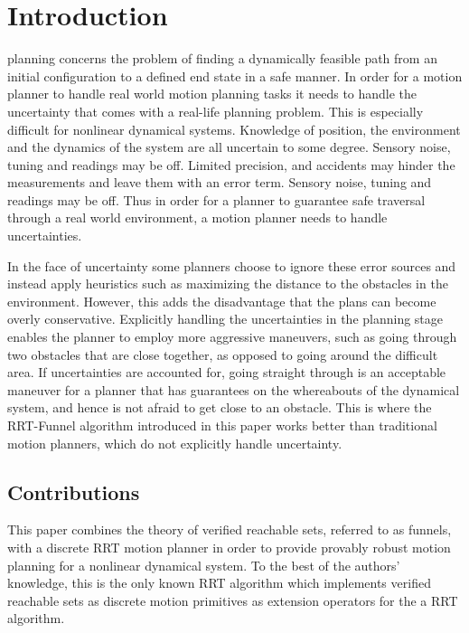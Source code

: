
\section{Introduction}
 planning concerns the problem of finding a dynamically
feasible path from an initial configuration to a defined end state in a safe
manner. In order for a motion planner to handle real world motion planning tasks
it needs to handle the uncertainty that comes with a real-life planning problem.
This is especially difficult for nonlinear dynamical systems. Knowledge of
position, the environment and the dynamics of the system are all uncertain to
some degree. Sensory noise, tuning and readings may be off. Limited precision,
and accidents may hinder the measurements and leave them with an error term.
Sensory noise, tuning and readings may be off. Thus in order for a planner to
guarantee safe traversal through a real world environment, a motion planner
needs to handle uncertainties.

In the face of uncertainty some planners choose to ignore these error sources
and instead apply heuristics such as maximizing the distance to the obstacles in
the environment. However, this adds the disadvantage that the plans can become
overly conservative. Explicitly handling the uncertainties in the planning stage
enables the planner to employ more aggressive maneuvers, such as going through
two obstacles that are close together, as opposed to going around the difficult
area. If uncertainties are accounted for, going straight through is an
acceptable maneuver for a planner that has guarantees on the whereabouts of the
dynamical system, and hence is not afraid to get close to an obstacle. This is
where the RRT-Funnel algorithm introduced in this paper works better than
traditional motion planners, which do not explicitly handle uncertainty.

\subsection{Contributions}

This paper combines the theory of verified reachable sets, referred to as
funnels, with a discrete RRT motion planner in order to provide provably robust
motion planning for a nonlinear dynamical system. To the best of the authors'
knowledge, this is the only known RRT algorithm which implements verified
reachable sets as discrete motion primitives as extension operators for the a
RRT algorithm.

